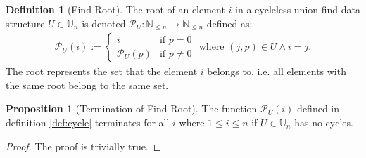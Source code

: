 \documentclass[a4paper,12pt]{article}
\theoremstyle{definition}
\newtheorem{definition}{Definition}[section]
\newtheorem{proposition}{Proposition}[section]
\begin{document}
\begin{definition}[Find Root]
    The root of an element $i$ in a cycleless union-find data structure $U \in
    \mathbb{U}_n$ is denoted $\mathcal{P}_U : \mathbb{N}_{\leq n} \to \mathbb{N}_{\leq n}$ defined as:
    \begin{align*}
        \mathcal{P}_U(i) := 
        \begin{cases}
            i & \text{if } p = 0 \\
            \mathcal{P}_U(p) & \text{if } p \neq 0
        \end{cases} \text{ where } (j, p) \in U \land i = j.
    \end{align*}
    The root represents the set that the element $i$ belongs to, i.e. all
    elements with the same root belong to the same set.
\end{definition}

\begin{proposition}[Termination of Find Root]
    The function $\mathcal{P}_U(i)$ defined in definition \ref{def:cycle}
    terminates for all $i$ where $1 \leq i \leq n$ if $U \in \mathbb{U}_n$ has
    no cycles.
\end{proposition}
\begin{proof}
    The proof is trivially true.
\end{proof}
\end{document}
